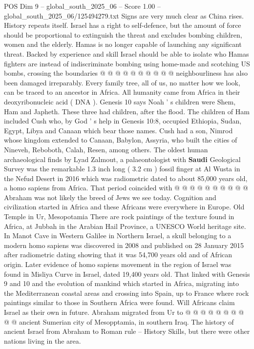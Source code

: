 \begin{textsample}{POS Dim 9 – global\_south\_2025\_06 – Score 1.00 – global\_south\_2025\_06/125494279.txt}
Signs are very much clear as China rises.
History repeats itself.
Israel has a right to self-defence, but the amount of force should be proportional to extinguish the threat and excludes bombing children, women and the elderly.
Hamas is no longer capable of launching any significant threat.
Backed by experience and skill Israel should be able to isolate who Hamas fighters are instead of indiscriminate bombing using home-made and scotching US bombs, crossing the boundaries @ @ @ @ @ @ @ @ @ @ neighbourliness has also been damaged irreparably.
Every family tree, all of us, no matter how we look, can be traced to an ancestor in Africa.
All humanity came from Africa in their deoxyribonucleic acid ( DNA ).
Genesis 10 says Noah ' s children were Shem, Ham and Japheth.
These three had children, after the flood.
The children of Ham included Cush who, by God ' s help in Genesis 10:8, occupied Ethiopia, Sudan, Egypt, Libya and Canaan which bear those names.
Cush had a son, Nimrod whose kingdom extended to Canaan, Babylon, Assyria, who built the cities of Nineveh, Reboboth, Calah, Resen, among others.
The oldest human archaeological finds by Lyad Zalmout, a palaeontologist with \textbf{Saudi} Geological Survey was the remarkable 1.3 inch long ( 3.2 cm ) fossil finger at Al Wusta in the Nefud Desert in 2016 which was radiometric dated to about 85,000 years old, a homo sapiens from Africa.
That period coincided with @ @ @ @ @ @ @ @ @ @ Abraham was not likely the breed of Jews we see today.
Cognition and civilization started in Africa and these Africans were everywhere in Europe.
Old Temple in Ur, Mesopotamia There are rock paintings of the texture found in Africa, at Jubbah in the Arabian Hail Province, a UNESCO World heritage site.
In Manot Cave in Western Galilee in Northern Israel, a skull belonging to a modern homo sapiens was discovered in 2008 and published on 28 January 2015 after radiometric dating showing that it was 54,700 years old and of African origin.
Later evidence of homo sapiens movement in the region of Israel was found in Misliya Curve in Israel, dated 19,400 years old.
That linked with Genesis 9 and 10 and the evolution of mankind which started in Africa, migrating into the Mediterranean coastal areas and crossing into Spain, up to France where rock paintings similar to those in Southern Africa were found.
Will Africans claim Israel as their own in future.
Abraham migrated from Ur to @ @ @ @ @ @ @ @ @ @ ancient Sumerian city of Mesopptamia, in southern Iraq.
The history of ancient Israel from Abraham to Roman rule -- History Skills, but there were other nations living in the area.

\end{textsample}
